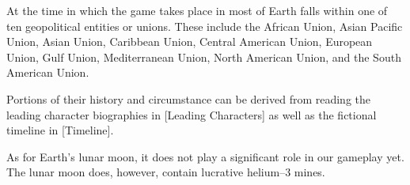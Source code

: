 


At the time in which the game takes place in most of Earth falls within one of ten geopolitical entities or unions. These include the African Union, Asian Pacific Union, Asian Union, Caribbean Union, Central American Union, European Union, Gulf Union, Mediterranean Union, North American Union, and the South American Union. 

Portions of their history and circumstance can be derived from reading the leading character biographies in [Leading Characters] as well as the fictional timeline in [Timeline].

As for Earth's lunar moon, it does not play a significant role in our gameplay yet. The lunar moon does, however, contain lucrative helium--3 mines.

